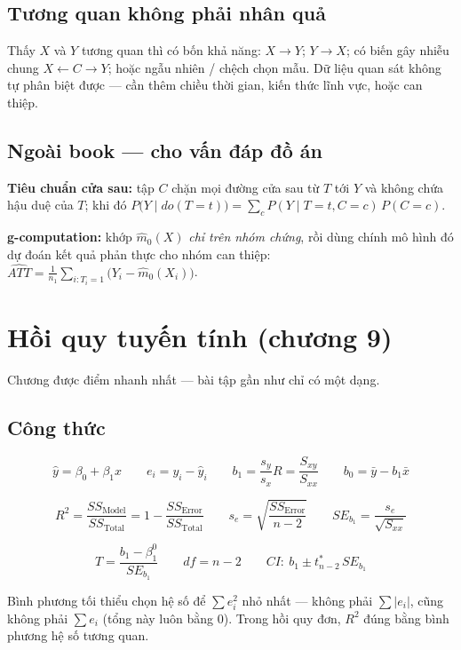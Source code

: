 \documentclass[11pt]{article}
\begin{document}
\subsection*{Tương quan không phải nhân quả}

Thấy $X$ và $Y$ tương quan thì có bốn khả năng: $X \to Y$; $Y \to X$; có biến gây
nhiễu chung $X \leftarrow C \to Y$; hoặc ngẫu nhiên / chệch chọn mẫu. Dữ liệu quan
sát không tự phân biệt được --- cần thêm chiều thời gian, kiến thức lĩnh vực, hoặc
can thiệp.

\subsection*{Ngoài book --- cho vấn đáp đồ án}

\textbf{Tiêu chuẩn cửa sau:} tập $C$ chặn mọi đường cửa sau từ $T$ tới $Y$ và không
chứa hậu duệ của $T$; khi đó
$P\bigl(Y \mid do(T{=}t)\bigr) = \sum_c P(Y \mid T{=}t, C{=}c)\,P(C{=}c)$.

\textbf{g-computation:} khớp $\hat m_0(X)$ \emph{chỉ trên nhóm chứng}, rồi dùng
chính mô hình đó dự đoán kết quả phản thực cho nhóm can thiệp:
$\widehat{ATT} = \frac{1}{n_1}\sum_{i:T_i=1}\bigl(Y_i - \hat m_0(X_i)\bigr)$.

\section{Hồi quy tuyến tính (chương 9)}

Chương được điểm nhanh nhất --- bài tập gần như chỉ có một dạng.

\subsection*{Công thức}

\[
\hat y = \beta_0 + \beta_1 x
\qquad
e_i = y_i - \hat y_i
\qquad
b_1 = \frac{s_y}{s_x}R = \frac{S_{xy}}{S_{xx}}
\qquad
b_0 = \bar y - b_1 \bar x
\]

\[
R^2 = \frac{SS_{\text{Model}}}{SS_{\text{Total}}} = 1 - \frac{SS_{\text{Error}}}{SS_{\text{Total}}}
\qquad
s_e = \sqrt{\frac{SS_{\text{Error}}}{n-2}}
\qquad
SE_{b_1} = \frac{s_e}{\sqrt{S_{xx}}}
\]

\[
T = \frac{b_1 - \beta_1^{0}}{SE_{b_1}}
\qquad
df = n-2
\qquad
CI:\ b_1 \pm t^{*}_{n-2}\,SE_{b_1}
\]

Bình phương tối thiểu chọn hệ số để $\sum e_i^2$ nhỏ nhất --- không phải
$\sum|e_i|$, cũng không phải $\sum e_i$ (tổng này luôn bằng 0). Trong hồi quy đơn,
$R^2$ đúng bằng bình phương hệ số tương quan.
\end{document}
